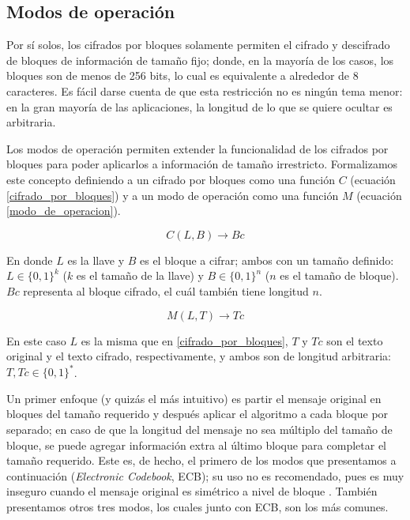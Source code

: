 %
%

\subsection{Modos de operación}

Por sí solos, los cifrados por bloques solamente permiten el cifrado y
descifrado de bloques de información de tamaño fijo; donde, en la mayoría de
los casos, los bloques son de menos de 256 bits\cite{modos_de_operacion}, lo
cual es equivalente a alrededor de 8 caracteres. Es fácil darse cuenta de que
esta restricción no es ningún tema menor: en la gran mayoría de las
aplicaciones, la longitud de lo que se quiere ocultar es arbitraria.


Los modos de operación permiten extender la funcionalidad de los cifrados por
bloques para poder aplicarlos a información de tamaño irrestricto. Formalizamos
este concepto definiendo a un cifrado por bloques como una función $ C $
(ecuación \ref{cifrado_por_bloques}) y a un modo de operación como una función
$ M $ (ecuación \ref{modo_de_operacion}).

\begin{equation}
  \label{cifrado_por_bloques}
  C(L, B) \rightarrow Bc
\end{equation}

En donde $ L $ es la llave y $ B $ es el bloque a cifrar; ambos con un tamaño
definido: $ L \in \{0, 1\}^k $ ($ k $ es el tamaño de la llave) y
$ B \in \{0, 1\}^n $ ($ n $ es el tamaño de bloque). $ Bc $ representa al
bloque cifrado, el cuál también tiene longitud $ n $.

\begin{equation}
  \label{modo_de_operacion}
  M(L, T) \rightarrow Tc
\end{equation}

En este caso $ L $ es la misma que en \ref{cifrado_por_bloques}, $ T $ y
$ Tc $ son el texto original y el texto cifrado, respectivamente, y ambos
son de longitud arbitraria: $ T, Tc \in \{0, 1\}^* $.


Un primer enfoque (y quizás el más intuitivo) es partir el mensaje original
en bloques del tamaño requerido y después aplicar el algoritmo a cada bloque
por separado; en caso de que la longitud del mensaje no sea múltiplo del
tamaño de bloque, se puede agregar información extra al último bloque para
completar el tamaño requerido. Este es, de hecho, el primero de los modos que
presentamos a continuación (\textit{Electronic Codebook}, ECB); su uso no es
recomendado, pues es muy inseguro cuando el mensaje original es simétrico a
nivel de bloque \cite{modos_de_operacion}. También presentamos otros tres
modos, los cuales junto con ECB, son los más comunes.






